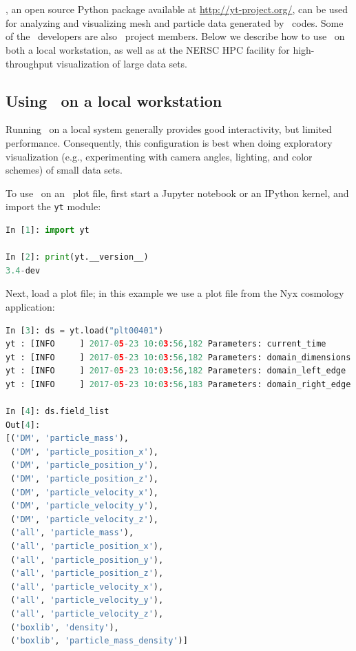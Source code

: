 \section{\yt}

\yt, an open source Python package available at \url{http://yt-project.org/},
can be used for analyzing and visualizing mesh and particle data generated by
\amrex\ codes.  Some of the \amrex\ developers are also \yt\ project members.
Below we describe how to use \yt\ on both a local workstation, as well as at
the NERSC HPC facility for high-throughput visualization of large data sets.

\subsection{Using \yt\ on a local workstation}

Running \yt\ on a local system generally provides good interactivity, but
limited performance. Consequently, this configuration is best when doing
exploratory visualization (e.g., experimenting with camera angles, lighting,
and color schemes) of small data sets.

To use \yt\ on an \amrex\ plot file, first start a Jupyter notebook or an IPython kernel, and import the \texttt{yt} module:

\begin{lstlisting}[language=python,breaklines=true]
In [1]: import yt

In [2]: print(yt.__version__)
3.4-dev
\end{lstlisting}

Next, load a plot file; in this example we use a plot file from the Nyx cosmology application:

\begin{lstlisting}[language=python,breaklines=true]
In [3]: ds = yt.load("plt00401")
yt : [INFO     ] 2017-05-23 10:03:56,182 Parameters: current_time              = 0.00605694344696544
yt : [INFO     ] 2017-05-23 10:03:56,182 Parameters: domain_dimensions         = [128 128 128]
yt : [INFO     ] 2017-05-23 10:03:56,182 Parameters: domain_left_edge          = [ 0.  0.  0.]
yt : [INFO     ] 2017-05-23 10:03:56,183 Parameters: domain_right_edge         = [ 14.24501  14.24501  14.24501]

In [4]: ds.field_list
Out[4]:
[('DM', 'particle_mass'),
 ('DM', 'particle_position_x'),
 ('DM', 'particle_position_y'),
 ('DM', 'particle_position_z'),
 ('DM', 'particle_velocity_x'),
 ('DM', 'particle_velocity_y'),
 ('DM', 'particle_velocity_z'),
 ('all', 'particle_mass'),
 ('all', 'particle_position_x'),
 ('all', 'particle_position_y'),
 ('all', 'particle_position_z'),
 ('all', 'particle_velocity_x'),
 ('all', 'particle_velocity_y'),
 ('all', 'particle_velocity_z'),
 ('boxlib', 'density'),
 ('boxlib', 'particle_mass_density')]
\end{lstlisting}

